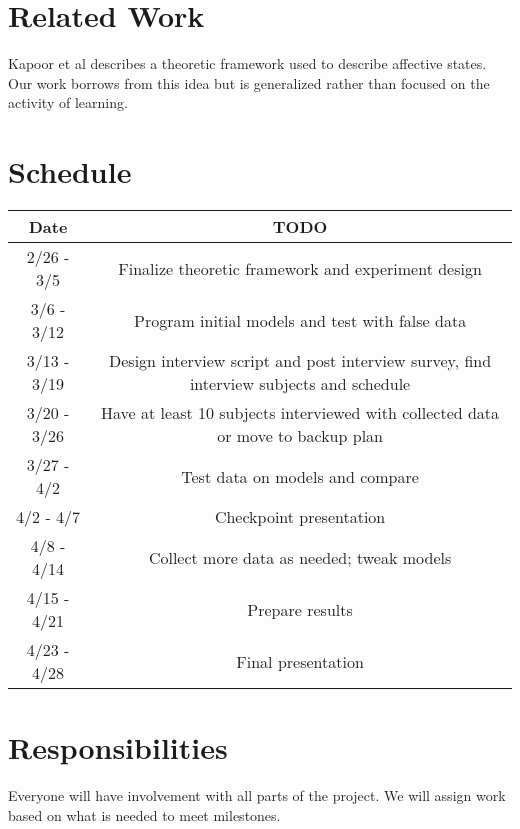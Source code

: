 \documentclass[12pt,letterpaper]{article}
\begin{document}
\section{Related Work}
Kapoor et al \cite{kapoor2001towards} describes a theoretic framework used to describe affective states.  Our work borrows from this idea but is generalized rather than focused on the activity of learning.

\newpage
\section{Schedule}

\begin{center}
\begin{tabular}{ c | c }
\bf{Date} & \bf{TODO} \\ \hline
2/26 - 3/5 & Finalize theoretic framework and experiment design\\
3/6 - 3/12 & Program initial models and test with false data\\
3/13 - 3/19 & Design interview script and post interview survey, find interview subjects and schedule\\
3/20 - 3/26 & Have at least 10 subjects interviewed with collected data or move to backup plan\\
3/27 - 4/2 & Test data on models and compare\\
4/2 - 4/7 & Checkpoint presentation\\
4/8 - 4/14 & Collect more data as needed; tweak models\\
4/15 - 4/21 & Prepare results\\
4/23 - 4/28 & Final presentation
\end{tabular}
\end{center}

\section{Responsibilities}
Everyone will have involvement with all parts of the project.  We will assign work based on what is needed to meet milestones.



\end{document}

